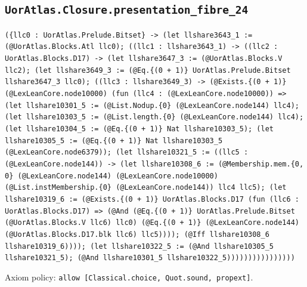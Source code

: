 \documentclass[11pt]{article}
\begin{document}
\subsection*{\texttt{UorAtlas.Closure.presentation\_fibre\_24}}
\noindent\texttt{(\{llc0 : UorAtlas.Prelude.Bitset\} -> (let llshare3643\_1 := (@UorAtlas.Blocks.Atl llc0); ((llc1 : llshare3643\_1) -> ((llc2 : UorAtlas.Blocks.D17) -> (let llshare3647\_3 := (@UorAtlas.Blocks.V llc2); (let llshare3649\_3 := (@Eq.\{(0 + 1)\} UorAtlas.Prelude.Bitset llshare3647\_3 llc0); ((llc3 : llshare3649\_3) -> (@Exists.\{(0 + 1)\} (@LexLeanCore.node10000) (fun (llc4 : (@LexLeanCore.node10000)) => (let llshare10301\_5 := (@List.Nodup.\{0\} (@LexLeanCore.node144) llc4); (let llshare10303\_5 := (@List.length.\{0\} (@LexLeanCore.node144) llc4); (let llshare10304\_5 := (@Eq.\{(0 + 1)\} Nat llshare10303\_5); (let llshare10305\_5 := (@Eq.\{(0 + 1)\} Nat llshare10303\_5 (@LexLeanCore.node6379)); (let llshare10321\_5 := ((llc5 : (@LexLeanCore.node144)) -> (let llshare10308\_6 := (@Membership.mem.\{0, 0\} (@LexLeanCore.node144) (@LexLeanCore.node10000) (@List.instMembership.\{0\} (@LexLeanCore.node144)) llc4 llc5); (let llshare10319\_6 := (@Exists.\{(0 + 1)\} UorAtlas.Blocks.D17 (fun (llc6 : UorAtlas.Blocks.D17) => (@And (@Eq.\{(0 + 1)\} UorAtlas.Prelude.Bitset (@UorAtlas.Blocks.V llc6) llc0) (@Eq.\{(0 + 1)\} (@LexLeanCore.node144) (@UorAtlas.Blocks.D17.blk llc6) llc5)))); (@Iff llshare10308\_6 llshare10319\_6)))); (let llshare10322\_5 := (@And llshare10305\_5 llshare10321\_5); (@And llshare10301\_5 llshare10322\_5))))))))))))))))}\par
\noindent Axiom policy: \texttt{allow [Classical.choice, Quot.sound, propext]}.\par
\end{document}
